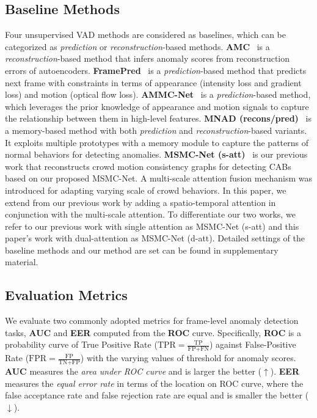 \documentclass[journal]{IEEEtran}
\begin{document}
\subsection{Baseline Methods}
\noindent Four unsupervised VAD methods are considered as baselines, which can be categorized as \emph{prediction} or \emph{reconstruction}-based methods. \textbf{AMC}~\cite{nguyen2019anomaly} is a \emph{reconstruction}-based method that infers anomaly scores from reconstruction errors of autoencoders. \textbf{FramePred}~\cite{liu2018future} is a \emph{prediction}-based method that predicts next frame  with constraints in terms of appearance (intensity loss and gradient loss) and motion (optical flow loss). 
\textbf{AMMC-Net}~\cite{cai2021appearance} is a \emph{prediction}-based method, which leverages the prior knowledge of appearance and motion signals to capture the relationship between them in high-level features. \textbf{MNAD (recons/pred)}~\cite{park2020learning} is a memory-based method with both \emph{prediction} and \emph{reconstruction}-based variants. It exploits multiple prototypes with a memory module to capture the patterns of normal behaviors for detecting anomalies. \textbf{MSMC-Net (s-att)}~\cite{luo2023crowd} is our previous work that reconstructs crowd motion consistency graphs for detecting CABs based on our proposed MSMC-Net. A multi-scale attention fusion mechanism was introduced for adapting varying scale of crowd behaviors. In this paper, we extend from our previous work by adding a spatio-temporal attention in conjunction with the multi-scale attention. To differentiate our two works, we refer to our previous work with single attention as MSMC-Net (s-att) and this paper's work with dual-attention as MSMC-Net (d-att). Detailed settings of the baseline methods and our method are set can be found in supplementary material.




\subsection{Evaluation Metrics}
\noindent We evaluate two commonly adopted metrics for frame-level anomaly detection tasks,  \textbf{AUC} and \textbf{EER} computed from the \textbf{ROC} curve. Specifically, \textbf{ROC} is a probability curve of True Positive Rate ($\mbox{TPR} = \frac{\mbox{TP}}{\mbox{FP} + \mbox{FN}}$) against False-Positive Rate ($\mbox{FPR} = \frac{\mbox{FP}}{\mbox{TN} + \mbox{FP}}$) with the varying values of threshold for anomaly scores. \textbf{AUC} measures the \emph{area under ROC curve} and is larger the better ($\uparrow$). \textbf{EER} measures the \emph{equal error rate} in terms of the location on ROC curve, where the false acceptance rate and false rejection rate are equal and is smaller the better ($\downarrow$).
\end{document}
